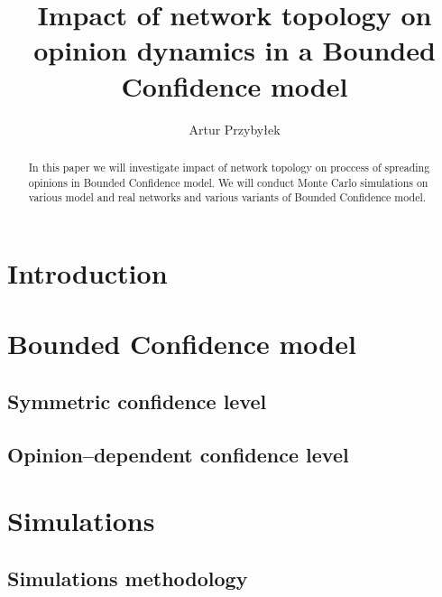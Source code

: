 \documentclass{article}
\title{Impact of network topology on opinion dynamics in a Bounded Confidence model}
\author{Artur Przybyłek}
\begin{document}
\begin{titlepage}
	\maketitle
	\begin{abstract}
	In this paper we will investigate impact of network topology on proccess of spreading opinions in Bounded Confidence model. We will conduct Monte Carlo simulations on various model and real networks and various variants of Bounded Confidence model.
	\end{abstract}
\end{titlepage}


\tableofcontents

\newpage

\section{Introduction}
\section{Bounded Confidence model}
	
\subsection{Symmetric confidence level}
\subsection{Opinion--dependent confidence level}

\section{Simulations}

\subsection{Simulations methodology}
\end{document}
